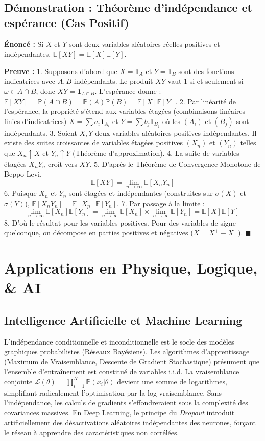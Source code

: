 \documentclass[11pt,a4paper]{article}
\begin{document}
\subsection{Démonstration : Théorème d'indépendance et espérance (Cas Positif)}

\textbf{Énoncé :} Si $X$ et $Y$ sont deux variables aléatoires réelles positives et indépendantes, $\mathbb{E}[XY] = \mathbb{E}[X]\mathbb{E}[Y]$.

\textbf{Preuve :}
1. Supposons d'abord que $X = \mathbf{1}_A$ et $Y = \mathbf{1}_B$ sont des fonctions indicatrices avec $A, B$ indépendants.
   Le produit $XY$ vaut $1$ si et seulement si $\omega \in A \cap B$, donc $XY = \mathbf{1}_{A \cap B}$.
   L'espérance donne : $\mathbb{E}[XY] = \mathbb{P}(A \cap B) = \mathbb{P}(A)\mathbb{P}(B) = \mathbb{E}[X]\mathbb{E}[Y]$.
2. Par linéarité de l'espérance, la propriété s'étend aux variables étagées (combinaisons linéaires finies d'indicatrices) $X = \sum a_i \mathbf{1}_{A_i}$ et $Y = \sum b_j \mathbf{1}_{B_j}$ où les $(A_i)$ et $(B_j)$ sont indépendants.
3. Soient $X, Y$ deux variables aléatoires positives indépendantes. Il existe des suites croissantes de variables étagées positives $(X_n)$ et $(Y_n)$ telles que $X_n \uparrow X$ et $Y_n \uparrow Y$ (Théorème d'approximation).
4. La suite de variables étagées $X_n Y_n$ croît vers $XY$.
5. D'après le Théorème de Convergence Monotone de Beppo Levi,
   $$\mathbb{E}[XY] = \lim_{n \to \infty} \mathbb{E}[X_n Y_n]$$
6. Puisque $X_n$ et $Y_n$ sont étagées et indépendantes (construites sur $\sigma(X)$ et $\sigma(Y)$), $\mathbb{E}[X_n Y_n] = \mathbb{E}[X_n]\mathbb{E}[Y_n]$.
7. Par passage à la limite :
   $$\lim_{n \to \infty} \mathbb{E}[X_n]\mathbb{E}[Y_n] = \lim_{n \to \infty} \mathbb{E}[X_n] \times \lim_{n \to \infty} \mathbb{E}[Y_n] = \mathbb{E}[X]\mathbb{E}[Y]$$
8. D'où le résultat pour les variables positives. Pour des variables de signe quelconque, on décompose en parties positives et négatives ($X = X^+ - X^-$). $\blacksquare$

\section{Applications en Physique, Logique, \& AI}

\subsection{Intelligence Artificielle et Machine Learning}
L'indépendance conditionnelle et inconditionnelle est le socle des modèles graphiques probabilistes (Réseaux Bayésiens). Les algorithmes d'apprentissage (Maximum de Vraisemblance, Descente de Gradient Stochastique) présument que l'ensemble d'entraînement est constitué de variables i.i.d. La vraisemblance conjointe $\mathcal{L}(\theta) = \prod_{i=1}^N \mathbb{P}(x_i | \theta)$ devient une somme de logarithmes, simplifiant radicalement l'optimisation par la log-vraisemblance. Sans l'indépendance, les calculs de gradients s'effondreraient sous la complexité des covariances massives. En Deep Learning, le principe du \textit{Dropout} introduit artificiellement des désactivations aléatoires indépendantes des neurones, forçant le réseau à apprendre des caractéristiques non corrélées.
\end{document}
